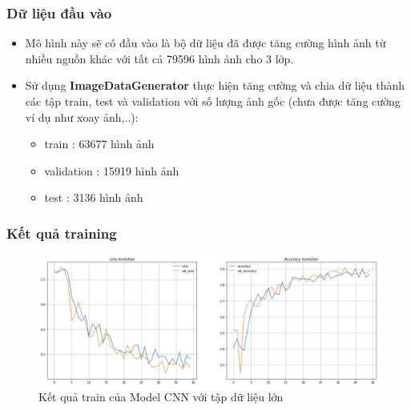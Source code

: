 \subsubsection{Dữ liệu đầu vào }
\begin{itemize}
    \item Mô hình này sẽ có đầu vào là bộ dữ liệu đã được tăng cường hình ảnh từ nhiều nguồn khác với tất cả 79596 hình ảnh cho 3 lớp.

    \item Sử dụng \textbf{ImageDataGenerator} thực hiện tăng cường và chia dữ liệu thành các tập train, test và validation với số lượng ảnh gốc (chưa được tăng cường ví dụ như xoay ảnh,..):
    \begin{itemize}
        \item train : 63677 hình ảnh
        \item validation : 15919 hình ảnh
        \item test : 3136 hình ảnh
    \end{itemize}
\end{itemize}

\subsubsection{Kết quả training}
\begin{center}
    \begin{figure}[!h]
        \centering
        \includegraphics[scale = 0.38]{fileanh/CNNtc.png}
        \caption{Kết quả train của Model CNN với tập dữ liệu lớn}
    \end{figure}
\end{center}
